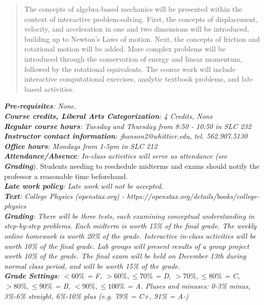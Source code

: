 \documentclass[10pt]{article}
\begin{document}
\maketitle

\begin{abstract}
The concepts of algebra-based mechanics will be presented within the context of interactive problem-solving.  First, the concepts of displacement, velocity, and acceleration in one and two dimensions will be introduced, building up to Newton's Laws of motion.  Next, the concepts of friction and rotational motion will be added.  More complex problems will be introduced through the conservation of energy and linear momentum, followed by the rotational equivalents.  The course work will include interactive computational exercises, analytic textbook problems, and lab-based activities.
\end{abstract}
\noindent
\textit{\textbf{Pre-requisites}: None.} \\
\textit{\textbf{Course credits, Liberal Arts Categorization}: 4 Credits, None} \\
\textit{\textbf{Regular course hours}: Tuesday and Thursday from 8:50 - 10:50 in SLC 232} \\
\textit{\textbf{Instructor contact information}: jhanson2@whittier.edu, tel. 562.907.5130} \\
\textit{\textbf{Office hours}: Mondays from 1-5pm in SLC 212} \\
\textit{\textbf{Attendance/Absence}: In-class activities will serve as attendance (see \textit{\textbf{Grading}}}).  Students needing to reschedule midterms and exams should notify the professor a reasonable time beforehand. \\
\textit{\textbf{Late work policy}: Late work will not be accepted.} \\
\textit{\textbf{Text}: College Physics (openstax.org) -  https://openstax.org/details/books/college-physics} \\
\textit{\textbf{Grading}: There will be three tests, each examining conceptual understanding in step-by-step problems.  Each midterm is worth 15\% of the final grade.  The weekly online homework is worth 20\% of the grade.  Interactive in-class activities will be worth 10\% of the final grade.  Lab groups will present results of a group project worth 10\% of the grade.  The final exam will be held on December 13th during normal class period, and will be worth 15\% of the grade.} \\
\textit{\textbf{Grade Settings}: $<60\%$ = F, $>60\%,\leq 70\%$ = D, $>70\%,\leq80\%$ = C, $>80\%,\leq 90\%$ = B, $<90\%,\leq 100\%$ = A.  Pluses and minuses: 0-3\% minus, 3\%-6\% straight, 6\%-10\% plus (e.g. 79\% = C+, 91\% = A-)} \\
\end{document}
